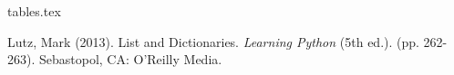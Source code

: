 \documentclass{article}
\begin{document}
{tables.tex}

\newpage
\begin{thebibliography}{9}
Lutz, Mark (2013). List and Dictionaries. \textit{Learning Python} (5th ed.). (pp. 262-263). Sebastopol, CA: O'Reilly Media.
\end{thebibliography}
\end{document}
